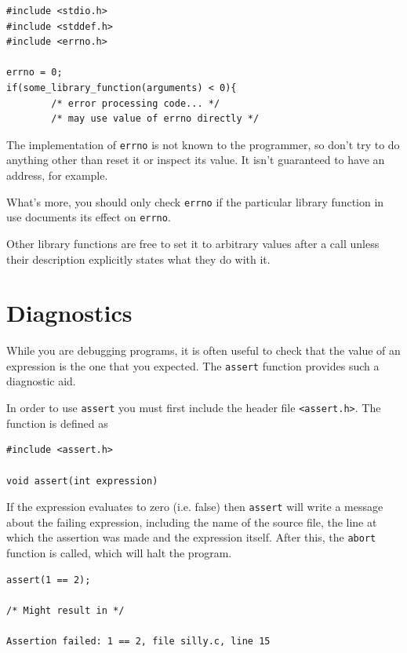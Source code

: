    \begin{Verbatim}
#include <stdio.h>
#include <stddef.h>
#include <errno.h>

errno = 0;
if(some_library_function(arguments) < 0){
        /* error processing code... */
        /* may use value of errno directly */
\end{Verbatim}

   The implementation of \texttt{errno} is not known to the  programmer,
    so  don't  try to do anything other than reset it or inspect
    its value.  It isn't guaranteed  to  have  an  address,  for
    example.


   What's more, you should only check \texttt{errno} if the particular
    library function in use documents its effect on \texttt{errno}.


   Other library functions are free  to  set  it  to  arbitrary
    values  after  a  call  unless  their description explicitly
    states what they do with it.


  

 
        \section{Diagnostics}
        

  

  While you are debugging programs, it is often useful to
   check that the value of an expression is the one that you
   expected. The \texttt{assert} function provides such a diagnostic
   aid.


  In order to use \texttt{assert} you must first include the header
   file \texttt{<assert.h>}.  The function is defined as


  \begin{Verbatim}
#include <assert.h>

void assert(int expression)
\end{Verbatim}

  If the expression  evaluates  to  zero  (i.e.   false)  then
   \texttt{assert}  will  write  a message about the failing expression,
   including the name of the source file, the line at which the
   assertion  was  made and the expression itself.  After this,
   the \texttt{abort} function is called, which will halt the program.


  \begin{Verbatim}
assert(1 == 2);

/* Might result in */

Assertion failed: 1 == 2, file silly.c, line 15
\end{Verbatim}

